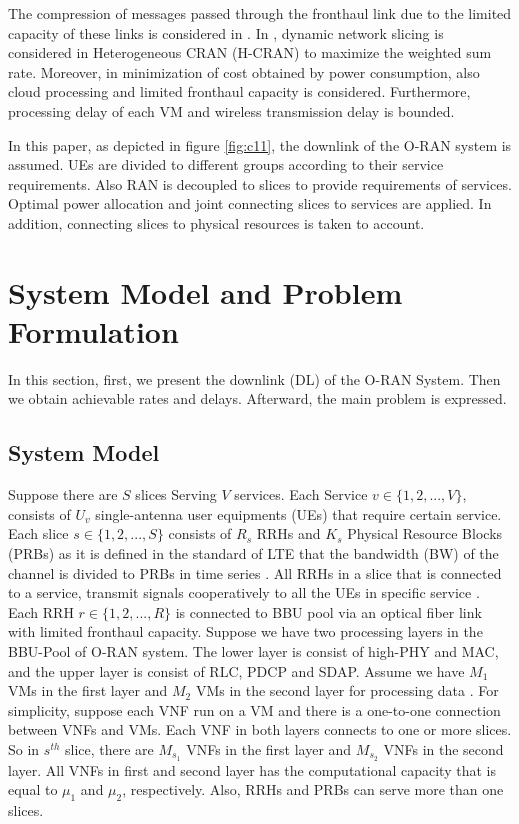 \documentclass[conference]{IEEEtran}
\begin{document}
The compression of messages passed through the fronthaul link due to the limited capacity of these links is considered in \cite{simeone2016cloud,1111}. 
In \cite{lee2018dynamic}, dynamic network slicing is considered in Heterogeneous CRAN (H-CRAN) to maximize the weighted sum rate. Moreover, in \cite{frdl,luong2018novel,luong2018novel1} minimization of cost obtained by power consumption, also cloud processing and limited fronthaul capacity is considered. Furthermore, processing delay of each VM and wireless transmission delay is bounded.

 
In this paper, as  depicted in figure \ref{fig:c11}, the downlink of the O-RAN system is assumed. UEs are divided to different groups according to 
their service requirements. Also RAN is decoupled to slices to provide requirements of services. Optimal power allocation and joint connecting slices to services are applied. In addition, connecting slices to physical resources is taken to account.


\section{System Model and Problem Formulation}
In this section, first, we present the downlink (DL) of the O-RAN System. Then we obtain achievable rates and delays.
Afterward, the main problem is expressed.
\subsection{System Model}
Suppose there are $S$ slices Serving $V$ services. Each Service $v\in \{1,2,...,V \} $, consists of $U_v$ single-antenna user equipments (UEs) that require certain service. Each slice $s \in \{1,2,...,S \}$ consists of $R_s$ RRHs and $K_s$ Physical Resource Blocks (PRBs) as it is defined in the standard of LTE that the bandwidth (BW) of the channel is divided to PRBs in time series \cite{lee2018dynamic}. All RRHs in a slice that is connected to a service, transmit signals cooperatively to all the UEs in specific service \cite{motalleb2017optimal,mimoCran}. Each RRH $r \in \{1,2,...,R \}$ is connected to BBU pool via an optical fiber link with limited fronthaul capacity.
Suppose we have two processing layers in the BBU-Pool of O-RAN system. The lower layer is consist of high-PHY and MAC, and the upper layer is consist of RLC, PDCP and SDAP.
Assume we have $M_1$ VMs in the first layer and $M_2$ VMs in the second layer for processing data .
For simplicity, suppose each VNF run on a VM and there is a one-to-one connection between VNFs and VMs.
Each VNF in both layers connects to one or more slices. So in $s^{th}$ slice, there are $M_{s_1}$ VNFs in the first layer and $M_{s_2}$ VNFs in the second layer. All VNFs in first and second layer has the computational capacity that is  equal to $\mu_1$ and $\mu_2$, respectively. 
Also, RRHs and PRBs can serve more than one slices. 
\end{document}
